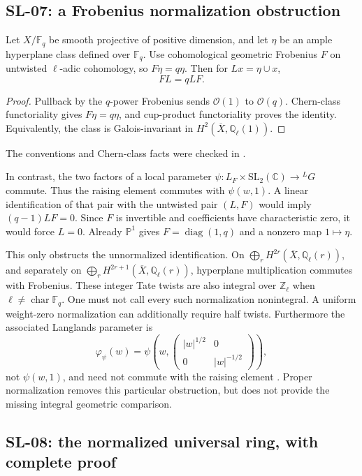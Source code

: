 \documentclass[11pt,a4paper]{article}
\theoremstyle{remark}
\begin{document}
\subsection{SL-07: a Frobenius normalization obstruction}
\label{sl:frobenius}

Let $X/\mathbb F_q$ be smooth projective of positive dimension, and let
$\eta$ be an ample hyperplane class defined over $\mathbb F_q$.  Use
cohomological geometric Frobenius $F$ on untwisted $\ell$-adic cohomology,
so $F\eta=q\eta$.  Then for $Lx=\eta\cup x$,
\[
 FL=qLF.
\]
\begin{proof}
Pullback by the $q$-power Frobenius sends $\mathcal O(1)$ to
$\mathcal O(q)$.  Chern-class functoriality gives $F\eta=q\eta$,
and cup-product functoriality proves the identity.  Equivalently, the class
is Galois-invariant in $H^2(\overline X,\mathbb Q_\ell(1))$.
\end{proof}
The conventions and Chern-class facts were checked in
\cite[Theorem 23.3 and \S27, especially Proposition 27.3]{MilneEtale}.

In contrast, the two factors of a local parameter
$\psi:L_F\times\mathrm{SL}_2(\mathbb C)\to{}^LG$ commute.  Thus the
raising element commutes with $\psi(w,1)$.  A linear identification of
that pair with the untwisted pair $(L,F)$ would imply
$(q-1)LF=0$.  Since $F$ is invertible and coefficients have characteristic
zero, it would force $L=0$.  Already $\mathbb P^1$ gives
$F=\operatorname{diag}(1,q)$ and a nonzero map $1\mapsto\eta$.

This only obstructs the unnormalized identification.  On
$\bigoplus_rH^{2r}(\overline X,\mathbb Q_\ell(r))$, and separately on
$\bigoplus_rH^{2r+1}(\overline X,\mathbb Q_\ell(r))$, hyperplane
multiplication commutes with Frobenius.  These integer Tate twists are
also integral over $\mathbb Z_\ell$ when $\ell\ne\operatorname{char}\mathbb F_q$.
One must not call every such normalization nonintegral.  A uniform
weight-zero normalization can additionally require half twists.
Furthermore the associated Langlands parameter is
\[
 \varphi_\psi(w)=\psi\left(w,
 \begin{pmatrix}|w|^{1/2}&0\\0&|w|^{-1/2}\end{pmatrix}\right),
\]
not $\psi(w,1)$, and need not commute with the raising element
\cite[\S2.2, equations (2.2.9)--(2.2.10)]{Mok}.  Proper normalization
removes this particular obstruction, but does not provide the missing
integral geometric comparison.

\subsection{SL-08: the normalized universal ring, with complete proof}
\label{sl:universal}
\end{document}
